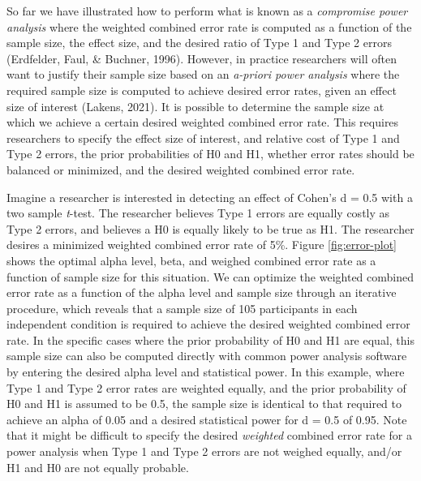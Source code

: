 \documentclass[
  english,
  ,man, a4paper,floatsintext]{apa6}
\begin{document}
So far we have illustrated how to perform what is known as a \emph{compromise power analysis} where the weighted combined error rate is computed as a function of the sample size, the effect size, and the desired ratio of Type 1 and Type 2 errors (Erdfelder, Faul, \& Buchner, 1996). However, in practice researchers will often want to justify their sample size based on an \emph{a-priori power analysis} where the required sample size is computed to achieve desired error rates, given an effect size of interest (Lakens, 2021). It is possible to determine the sample size at which we achieve a certain desired weighted combined error rate. This requires researchers to specify the effect size of interest, and relative cost of Type 1 and Type 2 errors, the prior probabilities of H0 and H1, whether error rates should be balanced or minimized, and the desired weighted combined error rate.

Imagine a researcher is interested in detecting an effect of Cohen's d = 0.5 with a two sample \emph{t}-test. The researcher believes Type 1 errors are equally costly as Type 2 errors, and believes a H0 is equally likely to be true as H1. The researcher desires a minimized weighted combined error rate of 5\%. Figure \ref{fig:error-plot} shows the optimal alpha level, beta, and weighed combined error rate as a function of sample size for this situation. We can optimize the weighted combined error rate as a function of the alpha level and sample size through an iterative procedure, which reveals that a sample size of 105 participants in each independent condition is required to achieve the desired weighted combined error rate. In the specific cases where the prior probability of H0 and H1 are equal, this sample size can also be computed directly with common power analysis software by entering the desired alpha level and statistical power. In this example, where Type 1 and Type 2 error rates are weighted equally, and the prior probability of H0 and H1 is assumed to be 0.5, the sample size is identical to that required to achieve an alpha of 0.05 and a desired statistical power for d = 0.5 of 0.95. Note that it might be difficult to specify the desired \emph{weighted} combined error rate for a power analysis when Type 1 and Type 2 errors are not weighed equally, and/or H1 and H0 are not equally probable.
\end{document}
